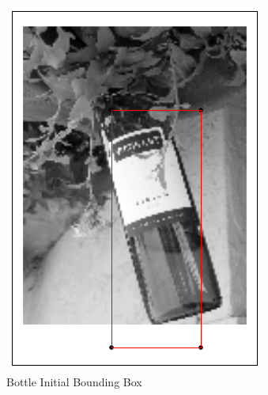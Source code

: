 \begin{figure}[h]
\begin{subfigure}[b]{0.1\textwidth}
            \includegraphics[width=\textwidth]{supports/Segmentation_Measure/bottle}
        \caption{Bottle Initial Bounding Box}
    \end{subfigure}
    \qquad
    \begin{subfigure}[b]{0.1\textwidth}

\end{subfigure}
\end{figure}
